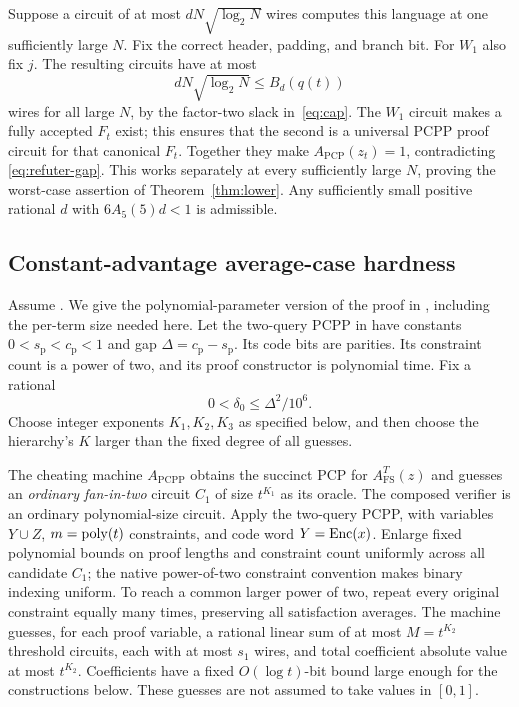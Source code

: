 Suppose a circuit of at most $dN\sqrt{\log_2N}$ wires computes this
language at one sufficiently large $N$. Fix the correct header,
padding, and branch bit. For $W_1$ also fix $j$. The resulting
circuits have at most
\[
 dN\sqrt{\log_2N}\le B_d(q(t))
\]
wires for all large $N$, by the factor-two slack in~\eqref{eq:cap}.
The $W_1$ circuit makes a fully accepted $F_t$ exist; this ensures
that the second is a universal PCPP proof circuit for that canonical
$F_t$. Together they make $A_{\mathrm{PCP}}(z_t)=1$, contradicting
\eqref{eq:refuter-gap}. This works separately at every sufficiently
large $N$, proving the worst-case assertion of
Theorem~\ref{thm:lower}. Any sufficiently small positive rational
$d$ with $6A_5(5)d<1$ is admissible.

\subsection{Constant-advantage average-case hardness}
\label{subsec:average}

Assume \HTC. We give the polynomial-parameter version of the proof
in \cite[Section 6]{CLW20}, including the per-term size needed here.
Let the two-query PCPP in \cite[Lemma 3.11]{CLW20} have constants
$0<s_{\mathrm p}<c_{\mathrm p}<1$ and gap
$\Delta=c_{\mathrm p}-s_{\mathrm p}$. Its code bits are parities.
Its constraint count is a power of two, and its proof constructor is
polynomial time. Fix a rational
\begin{equation}\label{eq:delta0}
 0<\delta_0\le\Delta^2/10^6.
\end{equation}
Choose integer exponents $K_1,K_2,K_3$ as specified below, and then
choose the hierarchy's $K$ larger than the fixed degree of all guesses.

The cheating machine $A_{\mathrm{PCPP}}$ obtains the succinct PCP
for $A^T_{\mathrm{FS}}(z)$ and guesses an \emph{ordinary fan-in-two}
circuit $C_1$ of size $t^{K_1}$ as its oracle. The composed verifier
is an ordinary polynomial-size circuit. Apply the two-query PCPP,
with variables $Y\cup Z$, $m=\operatorname{poly}(t)$ constraints, and code word
$Y=\operatorname{Enc}(x)$. Enlarge fixed polynomial bounds on proof lengths and
constraint count uniformly across all candidate $C_1$; the native
power-of-two constraint convention makes binary indexing uniform.
To reach a common larger power of two, repeat every original
constraint equally many times, preserving all satisfaction averages.
The machine guesses, for each proof variable, a rational linear sum
of at most $M=t^{K_2}$ threshold circuits, each with at most $s_1$
wires, and total coefficient absolute value at most $t^{K_2}$.
Coefficients have a fixed $O(\log t)$-bit bound large enough for the
constructions below. These guesses are not assumed to take values
in $[0,1]$.

